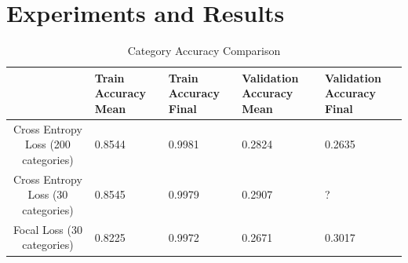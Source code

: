 \documentclass[10pt,twocolumn,letterpaper]{article}
\begin{document}
\section{Experiments and Results}
\begin{table}
\begin{center}
\begin{tabular}{|c|l|l|l|l|}
\hline
 & Train Accuracy Mean & Train Accuracy Final & Validation Accuracy Mean & Validation Accuracy Final \\
\hline\hline
Cross Entropy Loss (200 categories) & 0.8544 & 0.9981 & 0.2824 & 0.2635 \\
Cross Entropy Loss (30 categories) & 0.8545 & 0.9979 & 0.2907 & ? \\
Focal Loss (30 categories) & 0.8225 & 0.9972 & 0.2671 & 0.3017 \\
\hline
\end{tabular}
\end{center}
\caption{Category Accuracy Comparison}
\label{tab:category_accuracy}
\end{table}
\end{document}
